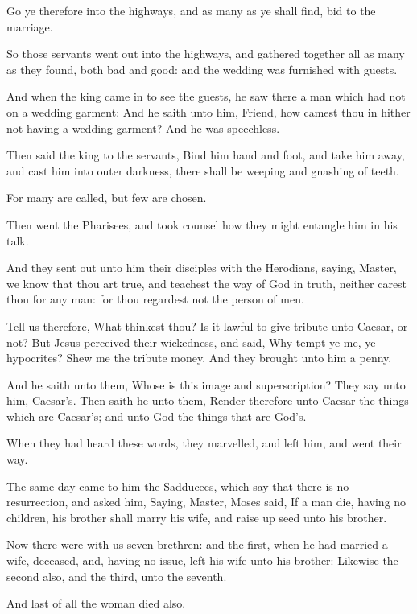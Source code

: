 \Verse Go ye therefore into the highways, and as many as ye shall find, bid to the marriage.

\Verse So those servants went out into the highways, and gathered together all as many as they found, both bad and good: and the wedding was furnished with guests.

\Verse And when the king came in to see the guests, he saw there a man which had not on a wedding garment: \Verse And he saith unto him, Friend, how camest thou in hither not having a wedding garment? And he was speechless.

\Verse Then said the king to the servants, Bind him hand and foot, and take him away, and cast him into outer darkness, there shall be weeping and gnashing of teeth.

\Verse For many are called, but few are chosen.

\Verse Then went the Pharisees, and took counsel how they might entangle him in his talk.

\Verse And they sent out unto him their disciples with the Herodians, saying, Master, we know that thou art true, and teachest the way of God in truth, neither carest thou for any man: for thou regardest not the person of men.

\Verse Tell us therefore, What thinkest thou? Is it lawful to give tribute unto Caesar, or not?  \Verse But Jesus perceived their wickedness, and said, Why tempt ye me, ye hypocrites?  \Verse Shew me the tribute money. And they brought unto him a penny.

\Verse And he saith unto them, Whose is this image and superscription?  \Verse They say unto him, Caesar's. Then saith he unto them, Render therefore unto Caesar the things which are Caesar's; and unto God the things that are God's.

\Verse When they had heard these words, they marvelled, and left him, and went their way.

\Verse The same day came to him the Sadducees, which say that there is no resurrection, and asked him, \Verse Saying, Master, Moses said, If a man die, having no children, his brother shall marry his wife, and raise up seed unto his brother.

\Verse Now there were with us seven brethren: and the first, when he had married a wife, deceased, and, having no issue, left his wife unto his brother: \Verse Likewise the second also, and the third, unto the seventh.

\Verse And last of all the woman died also.

